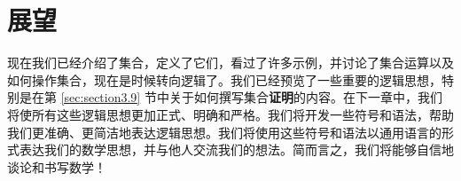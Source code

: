 \section{展望}

现在我们已经介绍了集合，定义了它们，看过了许多示例，并讨论了集合运算以及如何操作集合，现在是时候转向逻辑了。我们已经预览了一些重要的逻辑思想，特别是在第 \ref{sec:section3.9} 节中关于如何撰写集合\textbf{证明}的内容。在下一章中，我们将使所有这些逻辑思想更加正式、明确和严格。我们将开发一些符号和语法，帮助我们更准确、更简洁地表达逻辑思想。我们将使用这些符号和语法以通用语言的形式表达我们的数学思想，并与他人交流我们的想法。简而言之，我们将能够自信地谈论和书写数学！